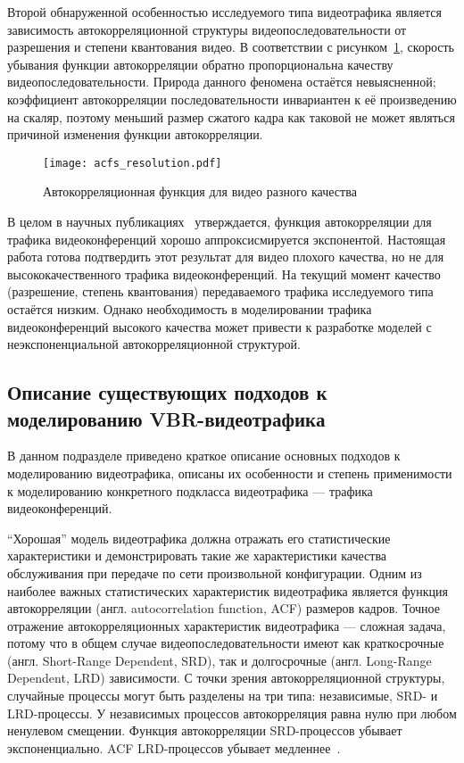 Второй обнаруженной особенностью исследуемого типа видеотрафика
является зависимость автокорреляционной структуры видеопоследовательности
от разрешения и степени квантования видео. В соответствии с рисунком~\ref{fig:acfs},
скорость убывания функции автокорреляции обратно пропорциональна качеству
видеопоследовательности. Природа данного феномена остаётся невыясненной;
коэффициент автокорреляции последовательности инвариантен к её произведению на скаляр,
поэтому меньший размер сжатого кадра как таковой не может являться
причиной изменения функции автокорреляции.

\begin{figure}[h]
    \begin{center}
        \texttt{[image: acfs\_resolution.pdf]}
    \end{center}
    \caption{Автокорреляционная функция для видео разного качества}
    \label{fig:acfs}
\end{figure}

В целом в научных публикациях~\cite{raey} утверждается, функция автокорреляции
для трафика видеоконференций хорошо аппроксисмируется экспонентой. Настоящая
работа готова подтвердить этот результат для видео плохого качества,
но не для высококачественного трафика видеоконференций. На текущий момент
качество (разрешение, степень квантования) передаваемого трафика исследуемого типа
остаётся низким. Однако необходимость в моделировании трафика видеоконференций
высокого качества может привести к разработке моделей с неэкспоненциальной
автокорреляционной структурой.

\newpage
\subsection{Описание существующих подходов к моделированию VBR-видеотрафика}
\label{sse:survey}

В данном подразделе приведено краткое описание основных подходов
к моделированию видеотрафика, описаны их особенности и степень
применимости к моделированию конкретного подкласса видеотрафика ---
трафика видеоконференций.

``Хорошая'' модель видеотрафика должна отражать его статистические
характеристики и демонстрировать такие же характеристики качества
обслуживания при передаче по сети произвольной конфигурации.
Одним из наиболее важных статистических характеристик
видеотрафика является функция автокорреляции (англ. autocorrelation function, ACF)
размеров кадров.
Точное отражение автокорреляционных характеристик видеотрафика ---
сложная задача, потому что в общем случае видеопоследовательности
имеют как краткосрочные (англ. Short-Range Dependent, SRD), так
и долгосрочные (англ. Long-Range Dependent, LRD) зависимости.
С точки зрения автокорреляционной структуры, случайные процессы
могут быть разделены на три типа: независимые, SRD- и LRD-процессы.
У независимых процессов автокорреляция равна нулю при любом
ненулевом смещении. Функция автокорреляции SRD-процессов
убывает экспоненциально. ACF LRD-процессов убывает медленнее~\cite{raey}.

